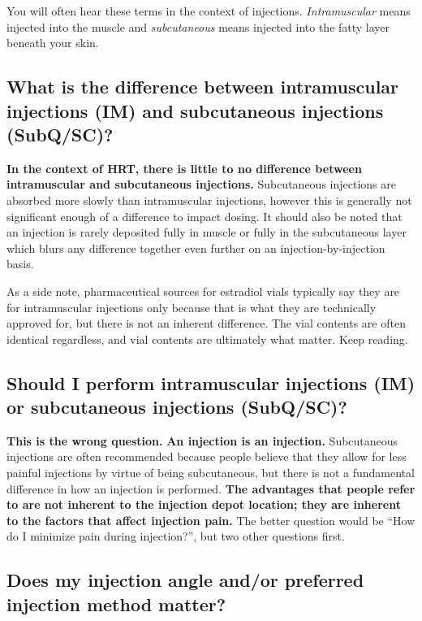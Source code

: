 \documentclass{article}
\begin{document}
You will often hear these terms in the context of injections. \textit{Intramuscular} means injected into the muscle and \textit{subcutaneous} means injected into the fatty layer beneath your skin.

\subsection{What is the difference between intramuscular injections (IM) and subcutaneous injections (SubQ/SC)?}

\textbf{In the context of HRT, there is little to no difference between intramuscular and subcutaneous injections.} Subcutaneous injections are absorbed more slowly than intramuscular injections, however this is generally not significant enough of a difference to impact dosing. It should also be noted that an injection is rarely deposited fully in muscle or fully in the subcutaneous layer which blurs any difference together even further on an injection-by-injection basis.

As a side note, pharmaceutical sources for estradiol vials typically say they are for intramuscular injections only because that is what they are technically approved for, but there is not an inherent difference. The vial contents are often identical regardless, and vial contents are ultimately what matter. Keep reading.

\subsection{Should I perform intramuscular injections (IM) or subcutaneous injections (SubQ/SC)?}

\textbf{This is the wrong question.} \textbf{An injection is an injection.} Subcutaneous injections are often recommended because people believe that they allow for less painful injections by virtue of being subcutaneous, but there is not a fundamental difference in how an injection is performed. \textbf{The advantages that people refer to are not inherent to the injection depot location; they are inherent to the factors that affect injection pain.} The better question would be “How do I minimize pain during injection?”, but two other questions first.

\subsection{Does my injection angle and/or preferred injection method matter?}
\end{document}
